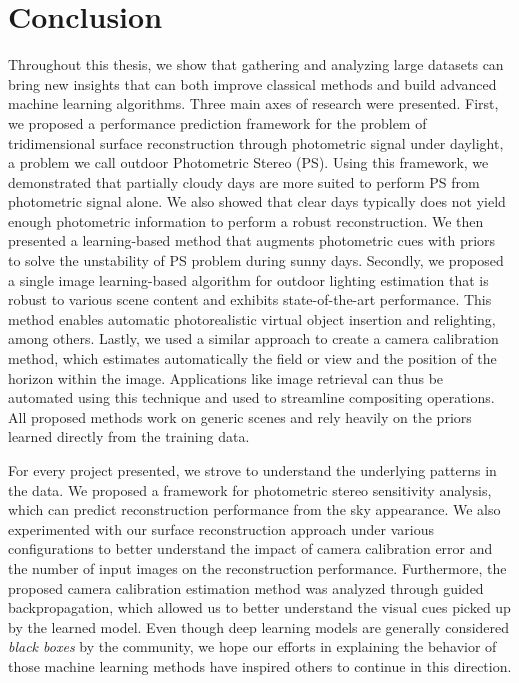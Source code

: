 \chapter*{Conclusion}         %


Throughout this thesis, we show that gathering and analyzing large datasets can bring new insights that can both improve classical methods and build advanced machine learning algorithms. Three main axes of research were presented. First, we proposed a performance prediction framework for the problem of tridimensional surface reconstruction through photometric signal under daylight, a problem we call outdoor Photometric Stereo (PS). Using this framework, we demonstrated that partially cloudy days are more suited to perform PS from photometric signal alone. We also showed that clear days typically does not yield enough photometric information to perform a robust reconstruction. We then presented a learning-based method that augments photometric cues with priors to solve the unstability of PS problem during sunny days. Secondly, we proposed a single image learning-based algorithm for outdoor lighting estimation that is robust to various scene content and exhibits state-of-the-art performance. This method enables automatic photorealistic virtual object insertion and relighting, among others. Lastly, we used a similar approach to create a camera calibration method, which estimates automatically the field or view and the position of the horizon within the image. Applications like image retrieval can thus be automated using this technique and used to streamline compositing operations. All proposed methods work on generic scenes and rely heavily on the priors learned directly from the training data. 

For every project presented, we strove to understand the underlying patterns in the data. We proposed a framework for photometric stereo sensitivity analysis, which can predict reconstruction performance from the sky appearance. We also experimented with our surface reconstruction approach under various configurations to better understand the impact of camera calibration error and the number of input images on the reconstruction performance. Furthermore, the proposed camera calibration estimation method was analyzed through guided backpropagation, which allowed us to better understand the visual cues picked up by the learned model. Even though deep learning models are generally considered \emph{black boxes} by the community, we hope our efforts in explaining the behavior of those machine learning methods have inspired others to continue in this direction.

